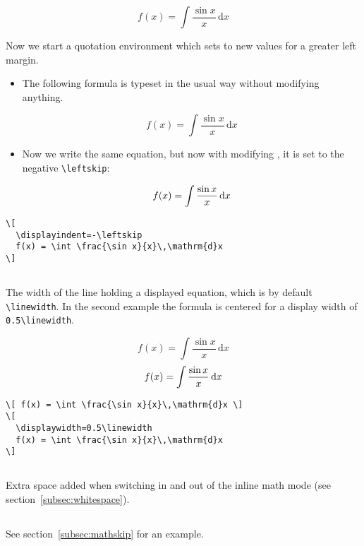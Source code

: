 \begin{table}[htb]
\[ f(x) = \int \frac{\sin x}{x}\,\mathrm{d}x \]

Now we start a quotation environment which sets  to new values for a 
greater    %
left margin.

\begin{itemize}
\item The following formula is typeset in the usual way without modifying anything.

\[ f(x) = \int \frac{\sin x}{x}\,\mathrm{d}x \]

\item Now we write the same equation, but now with modifying , it is set to
the negative \verb+\leftskip+:

\[
  \displayindent=-\labelwidth
  f(x) = \int \frac{\sin x}{x}\,\mathrm{d}x 
\]
\end{itemize}

\begin{lstlisting}
\[
  \displayindent=-\leftskip 
  f(x) = \int \frac{\sin x}{x}\,\mathrm{d}x 
\]
\end{lstlisting}

\subsection{}
The width of the line holding a displayed equation, which is by default 
\verb+\linewidth+. In the
second example the formula is centered for a display width of \verb+0.5\linewidth+.

\[ f(x) = \int \frac{\sin x}{x}\,\mathrm{d}x \]
\[
  \displaywidth=0.5\linewidth
  f(x) = \int \frac{\sin x}{x}\,\mathrm{d}x 
\]
\begin{lstlisting}
\[ f(x) = \int \frac{\sin x}{x}\,\mathrm{d}x \]
\[
  \displaywidth=0.5\linewidth
  f(x) = \int \frac{\sin x}{x}\,\mathrm{d}x 
\]
\end{lstlisting}

\subsection{}
Extra space added when switching in and out of the 
inline math mode (see section~\ref{subsec:whitespace}).

\subsection{}
See section~\ref{subsec:mathskip} for an example.


\end{table}
